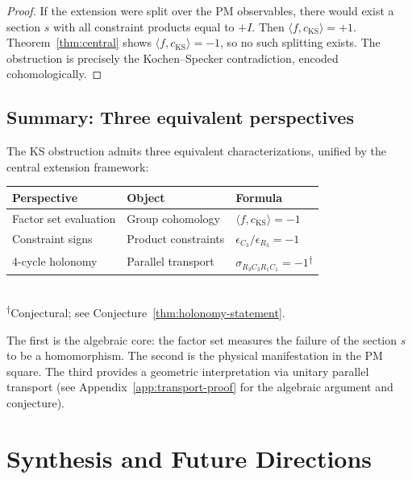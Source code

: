 \documentclass[11pt]{article}
\begin{document}
\begin{proof}
If the extension were split over the PM observables, there would exist
a section $s$ with all constraint products equal to $+I$. Then
$\langle f, c_{\mathrm{KS}} \rangle = +1$.
Theorem~\ref{thm:central} shows $\langle f, c_{\mathrm{KS}} \rangle = -1$,
so no such splitting exists. The obstruction is precisely the Kochen--Specker
contradiction, encoded cohomologically.
\end{proof}

\subsection{Summary: Three equivalent perspectives}

The KS obstruction admits three equivalent characterizations,
unified by the central extension framework:

\begin{center}
\renewcommand{\arraystretch}{1.4}
\begin{tabular}{lll}
\toprule
\textbf{Perspective} & \textbf{Object} & \textbf{Formula} \\
\midrule
Factor set evaluation & Group cohomology & $\langle f, c_{\mathrm{KS}} \rangle = -1$ \\
Constraint signs & Product constraints & $\epsilon_{C_3}/\epsilon_{R_3} = -1$ \\
4-cycle holonomy & Parallel transport & $\sigma_{R_3 C_3 R_1 C_1} = -1$\textsuperscript{${\dagger}$} \\
\bottomrule
\end{tabular}\\
\vspace{4pt}
\small\textsuperscript{${\dagger}$}Conjectural; see Conjecture~\ref{thm:holonomy-statement}.
\end{center}

The first is the algebraic core: the factor set measures the failure
of the section $s$ to be a homomorphism. The second is the physical
manifestation in the PM square. The third provides a geometric
interpretation via unitary parallel transport (see
Appendix~\ref{app:transport-proof} for the algebraic argument and conjecture).

\section{Synthesis and Future Directions}
\label{sec:synthesis}
\end{document}
